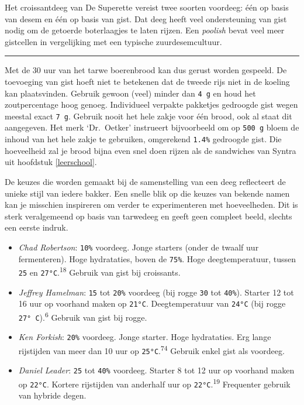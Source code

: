 \documentclass[
  11pt,
  dutch,
]{memoir}
\providecommand{\tightlist}{%
  \setlength{\itemsep}{0pt}\setlength{\parskip}{0pt}}
\begin{document}
Het croissantdeeg van De Superette vereist twee soorten voordeeg: één op
basis van desem en één op basis van gist. Dat deeg heeft veel
ondersteuning van gist nodig om de getoerde boterlaagjes te laten
rijzen. Een \emph{poolish} bevat veel meer gistcellen in vergelijking
met een typische zuurdesemcultuur.

\pfbreak

Met de 30 uur van het tarwe boerenbrood kan dus gerust worden gespeeld.
De toevoeging van gist hoeft niet te betekenen dat de tweede rijs niet
in de koeling kan plaatsvinden. Gebruik gewoon (veel) minder dan
\texttt{4\ g} en houd het zoutpercentage hoog genoeg. Individueel
verpakte pakketjes gedroogde gist wegen meestal exact \texttt{7\ g}.
Gebruik nooit het hele zakje voor één brood, ook al staat dit
aangegeven. Het merk `Dr.~Oetker' instrueert bijvoorbeeld om op
\texttt{500\ g} bloem de inhoud van het hele zakje te gebruiken,
omgerekend \texttt{1.4\%} gedroogde gist. Die hoeveelheid zal je brood
bijna even snel doen rijzen als de sandwiches van Syntra uit hoofdstuk
\ref{leerschool}.

De keuzes die worden gemaakt bij de samenstelling van een deeg
reflecteert de unieke stijl van iedere bakker. Een snelle blik op die
keuzes van bekende namen kan je misschien inspireren om verder te
experimenteren met hoeveelheden. Dit is sterk veralgemeend op basis van
tarwedeeg en geeft geen compleet beeld, slechts een eerste indruk.

\begin{itemize}
\tightlist
\item
  \emph{Chad Robertson}: \texttt{10\%} voordeeg. Jonge starters (onder
  de twaalf uur fermenteren). Hoge hydrataties, boven de \texttt{75\%}.
  Hoge deegtemperatuur, tussen \texttt{25} en
  \texttt{27°C}.\textsuperscript{18} Gebruik van gist bij croissants.
\item
  \emph{Jeffrey Hamelman}: \texttt{15} tot \texttt{20\%} voordeeg (bij
  rogge \texttt{30} tot \texttt{40\%}). Starter 12 tot 16 uur op
  voorhand maken op \texttt{21°C}. Deegtemperatuur van \texttt{24°C}
  (bij rogge \texttt{27°\ C}).\textsuperscript{6} Gebruik van gist bij
  rogge.
\item
  \emph{Ken Forkish}: \texttt{20\%} voordeeg. Jonge starter. Hoge
  hydrataties. Erg lange rijstijden van meer dan 10 uur op
  \texttt{25°C}.\textsuperscript{74} Gebruik enkel gist als voordeeg.
\item
  \emph{Daniel Leader}: \texttt{25} tot \texttt{40\%} voordeeg. Starter
  8 tot 12 uur op voorhand maken op \texttt{22°C}. Kortere rijstijden
  van anderhalf uur op \texttt{22°C}.\textsuperscript{19} Frequenter
  gebruik van hybride degen.
\end{itemize}
\end{document}
